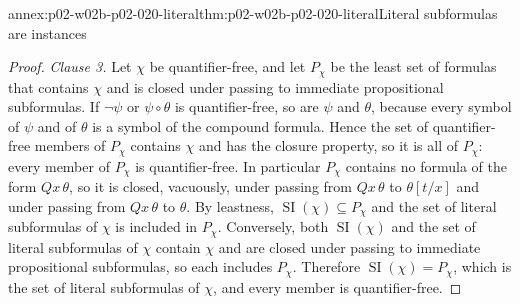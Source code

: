 \begin{annexitem}{annex:p02-w02b-p02-020-literal}{thm:p02-w02b-p02-020-literal}{Literal subformulas are instances}
\begin{proof}
\emph{Clause 3.}  Let \(\chi\) be quantifier-free, and let \(P_\chi\) be the
least set of formulas that contains \(\chi\) and is closed under passing to
immediate propositional subformulas.  If \(\neg\psi\) or \(\psi\circ\theta\)
is quantifier-free, so are \(\psi\) and \(\theta\), because every symbol of
\(\psi\) and of \(\theta\) is a symbol of the compound formula.  Hence the set
of quantifier-free members of \(P_\chi\) contains \(\chi\) and has the closure
property, so it is all of \(P_\chi\): every member of \(P_\chi\) is
quantifier-free.  In particular \(P_\chi\) contains no formula of the form
\(Qx\,\theta\), so it is closed, vacuously, under passing from \(Qx\,\theta\)
to \(\theta[t/x]\) and under passing from \(Qx\,\theta\) to \(\theta\).  By
leastness, \(\operatorname{SI}(\chi)\subseteq P_\chi\) and the set of literal
subformulas of \(\chi\) is included in \(P_\chi\).  Conversely, both
\(\operatorname{SI}(\chi)\) and the set of literal subformulas of \(\chi\)
contain \(\chi\) and are closed under passing to immediate propositional
subformulas, so each includes \(P_\chi\).  Therefore
\(\operatorname{SI}(\chi)=P_\chi\), which is the set of literal subformulas of
\(\chi\), and every member is quantifier-free.
\end{proof}
\end{annexitem}

